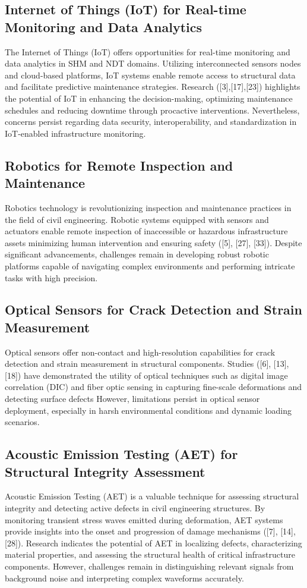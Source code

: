\documentclass[journal, a4paper]{IEEEtran}
\begin{document}
\subsection{Internet of Things (IoT) for Real-time Monitoring and Data Analytics}
The Internet of Things (IoT) offers opportunities for real-time monitoring and data analytics in SHM and NDT domains.
Utilizing interconnected sensors nodes and cloud-based platforms, IoT systems enable remote access to structural data
and facilitate predictive maintenance strategies. Research ([3],[17],[23]) highlights the potential of IoT in enhancing
the decision-making, optimizing maintenance schedules and reducing downtime through procactive interventions.
Nevertheless, concerns persist regarding data security, interoperability, and standardization in IoT-enabled
infrastructure monitoring.


\subsection{Robotics for Remote Inspection and Maintenance}
Robotics technology is revolutionizing inspection and maintenance practices in the field of civil engineering.
Robotic systems equipped with sensors and actuators enable remote inspection of inaccessible or hazardous infrastructure assets
 minimizing human intervention and ensuring safety ([5], [27], [33]). Despite significant advancements,
 challenges remain in developing robust robotic platforms capable of navigating complex environments
 and performing intricate tasks with high precision.

\subsection{Optical Sensors for Crack Detection and Strain Measurement}
Optical sensors offer non-contact and high-resolution capabilities for crack detection and strain measurement
in structural components. Studies ([6], [13], [18]) have demonstrated the utility of optical techniques such as
digital image correlation (DIC) and fiber optic sensing in capturing fine-scale deformations and detecting surface defects
However, limitations persist in optical sensor deployment, especially in harsh environmental conditions and dynamic loading
scenarios. 

\subsection{Acoustic Emission Testing (AET) for Structural Integrity Assessment}
Acoustic Emission Testing (AET) is a valuable technique for assessing structural integrity and detecting active defects
in civil engineering structures. By monitoring transient stress waves emitted during deformation, AET systems provide
insights into the onset and progression of damage mechanisms ([7], [14], [28]). Research indicates the potential of AET
in localizing defects, characterizing material properties, and assessing the structural health of critical infrastructure
components. However, challenges remain in distinguishing relevant signals from background noise and interpreting complex
waveforms accurately.
\end{document}
